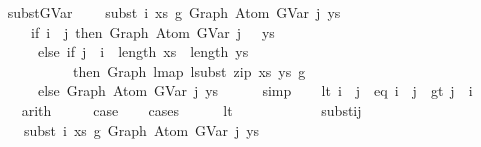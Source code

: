 \begin{isabellebody}
\isanewline
\ \ \isamarkupfalse%
\ subst{\isacharunderscore}{\kern0pt}GVar{\isacharcolon}{\kern0pt}\isanewline
\ \ \ \ {\isachardoublequoteopen}subst\ i\ xs\ g{}\ {\isacharparenleft}{\kern0pt}Graph\ {\isacharparenleft}{\kern0pt}Atom\ {\isacharparenleft}{\kern0pt}GVar\ j{\isacharparenright}{\kern0pt}\ ys{\isacharparenright}{\kern0pt}{\isacharparenright}{\kern0pt}\ {\isacharequal}{\kern0pt}\isanewline
\ \ \ \ \ \ \ {\isacharparenleft}{\kern0pt}if\ i\ {\isacharless}{\kern0pt}\ j\ then\ Graph\ {\isacharparenleft}{\kern0pt}Atom\ {\isacharparenleft}{\kern0pt}GVar\ {\isacharparenleft}{\kern0pt}j\ {\isacharminus}{\kern0pt}\ {}{\isacharparenright}{\kern0pt}{\isacharparenright}{\kern0pt}\ ys{\isacharparenright}{\kern0pt}\isanewline
\ \ \ \ \ \ \ \ else\ if\ j\ {\isacharequal}{\kern0pt}\ i\ {\isasymand}\ length\ xs\ {\isacharequal}{\kern0pt}\ length\ ys\isanewline
\ \ \ \ \ \ \ \ \ \ \ \ \ then\ Graph\ {\isacharparenleft}{\kern0pt}lmap\ {\isacharparenleft}{\kern0pt}lsubst\ {\isacharparenleft}{\kern0pt}zip\ xs\ ys{\isacharparenright}{\kern0pt}{\isacharparenright}{\kern0pt}\ g{}{\isacharparenright}{\kern0pt}\isanewline
\ \ \ \ \ \ \ \ else\ Graph\ {\isacharparenleft}{\kern0pt}Atom\ {\isacharparenleft}{\kern0pt}GVar\ j{\isacharparenright}{\kern0pt}\ ys{\isacharparenright}{\kern0pt}{\isacharparenright}{\kern0pt}{\isachardoublequoteclose}\isanewline
\ \ \ \ \isamarkupfalse%
\ simp\isanewline
\isanewline
\ \ \isamarkupfalse%
\ {\isacharparenleft}{\kern0pt}lt{\isacharparenright}{\kern0pt}\ {\isachardoublequoteopen}i\ {\isacharless}{\kern0pt}\ j{\isachardoublequoteclose}\ {\isacharbar}{\kern0pt}\ {\isacharparenleft}{\kern0pt}eq{\isacharparenright}{\kern0pt}\ {\isachardoublequoteopen}i\ {\isacharequal}{\kern0pt}\ j{\isachardoublequoteclose}\ {\isacharbar}{\kern0pt}\ {\isacharparenleft}{\kern0pt}gt{\isacharparenright}{\kern0pt}\ {\isachardoublequoteopen}j\ {\isacharless}{\kern0pt}\ i{\isachardoublequoteclose}\isanewline
\ \ \ \ \isamarkupfalse%
\ arith\isanewline
\ \ \isamarkupfalse%
\ \isamarkupfalse%
\ {\isacharquery}{\kern0pt}case\isanewline
\ \ \isamarkupfalse%
\ cases\isanewline
\ \ \ \ \isamarkupfalse%
\ lt\isanewline
\isanewline
\ \ \ \ \isanewline
\ \ \ \ \isamarkupfalse%
\ \isamarkupfalse%
\ subst{\isacharunderscore}{\kern0pt}ij{\isacharcolon}{\kern0pt}\isanewline
\ \ \ \ \ \ {\isachardoublequoteopen}subst\ i\ xs\ g{}\ {\isacharparenleft}{\kern0pt}Graph\ {\isacharparenleft}{\kern0pt}Atom\ {\isacharparenleft}{\kern0pt}GVar\ j{\isacharparenright}{\kern0pt}\ ys{\isacharparenright}{\kern0pt}{\isacharparenright}{\kern0pt}\isanewline

\end{isabellebody}

